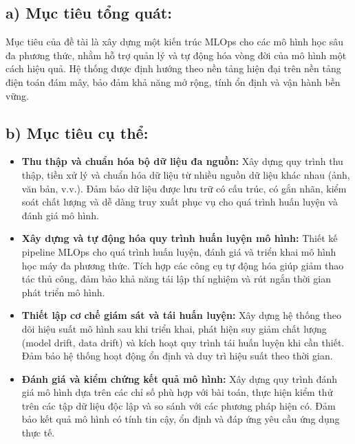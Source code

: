 
\subsection*{a) Mục tiêu tổng quát:}

Mục tiêu của đề tài là xây dựng một kiến trúc MLOps cho các mô hình học sâu đa phương thức, nhằm hỗ trợ quản lý và tự động hóa vòng đời của mô hình một cách hiệu quả. Hệ thống được định hướng theo nền tảng hiện đại trên nền tảng điện toán đám mây, bảo đảm khả năng mở rộng, tính ổn định và vận hành bền vững.


\subsection*{b) Mục tiêu cụ thể:}
\begin{itemize}
    \item \textbf{Thu thập và chuẩn hóa bộ dữ liệu đa nguồn:} 
    Xây dựng quy trình thu thập, tiền xử lý và chuẩn hóa dữ liệu từ nhiều nguồn dữ liệu khác nhau (ảnh, văn bản, v.v.). Đảm bảo dữ liệu được lưu trữ có cấu trúc, có gắn nhãn, kiểm soát chất lượng và dễ dàng truy xuất phục vụ cho quá trình huấn luyện và đánh giá mô hình.

    \item \textbf{Xây dựng và tự động hóa quy trình huấn luyện mô hình:} 
    Thiết kế pipeline MLOps cho quá trình huấn luyện, đánh giá và triển khai mô hình học máy đa phương thức. Tích hợp các công cụ tự động hóa giúp giảm thao tác thủ công, đảm bảo khả năng tái lập thí nghiệm và rút ngắn thời gian phát triển mô hình.

    \item \textbf{Thiết lập cơ chế giám sát và tái huấn luyện:} 
    Xây dựng hệ thống theo dõi hiệu suất mô hình sau khi triển khai, phát hiện suy giảm chất lượng (model drift, data drift) và kích hoạt quy trình tái huấn luyện khi cần thiết. Đảm bảo hệ thống hoạt động ổn định và duy trì hiệu suất theo thời gian.

    \item \textbf{Đánh giá và kiểm chứng kết quả mô hình:} 
    Xây dựng quy trình đánh giá mô hình dựa trên các chỉ số phù hợp với bài toán, thực hiện kiểm thử trên các tập dữ liệu độc lập và so sánh với các phương pháp hiện có. Đảm bảo kết quả mô hình có tính tin cậy, ổn định và đáp ứng yêu cầu ứng dụng thực tế.

\end{itemize}
